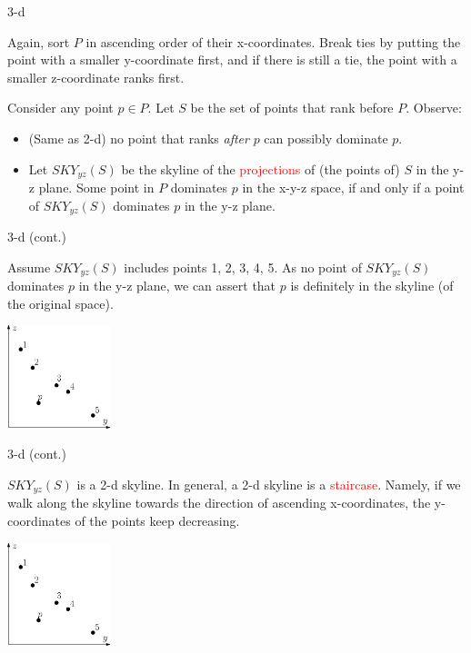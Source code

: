 \documentclass{beamer}
\def\vgap{\vspace{5mm}}
\newcommand{\red}[1]{\textcolor{red}{#1}}
\begin{document}
\begin{frame}{3-d}\label{fra:3d-sort}
\begin{small}
    Again, sort $P$ in ascending order of their x-coordinates. Break ties by putting the point with a smaller y-coordinate first, and if there is still a tie, the point with a smaller z-coordinate ranks first.

    \vgap

    Consider any point $p \in P$. Let $S$ be the set of points that rank before $P$. Observe:
    \begin{itemize}
        \item (Same as 2-d) no point that ranks {\em after} $p$ can possibly dominate $p$.

        \item Let $SKY_{yz}(S)$ be the skyline of the \red{projections} of (the points of) $S$ in the y-z plane. Some point in $P$ dominates $p$ in the x-y-z space, if and only if a point of $SKY_{yz}(S)$ dominates $p$ in the y-z plane.
    \end{itemize}
\end{small}
\end{frame}
\begin{frame}{3-d (cont.)}
\begin{small}
    \begin{example}
        Assume $SKY_{yz}(S)$ includes points 1, 2, 3, 4, 5. As no point of $SKY_{yz}(S)$ dominates $p$ in the y-z plane, we can assert that $p$ is definitely in the skyline (of the original space).
    \begin{center}
        \includegraphics[height=30mm]{./artwork/3d.eps}
    \end{center}
    \end{example}
\end{small}
\end{frame}
\begin{frame}{3-d (cont.)}
\begin{small}
    $SKY_{yz}(S)$ is a 2-d skyline. In general, a 2-d skyline is a \red{staircase}. Namely, if we walk along the skyline towards the direction of ascending x-coordinates, the y-coordinates of the points keep decreasing.
    \begin{center}
        \includegraphics[height=30mm]{./artwork/3d.eps}
    \end{center}
\end{small}
\end{frame}
\end{document}
